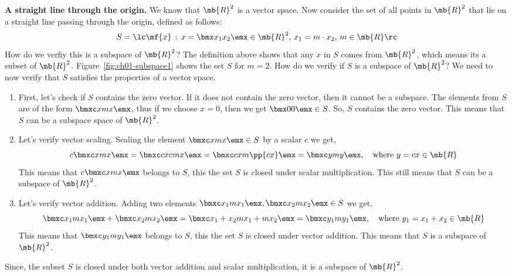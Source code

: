 \begin{boxedstuff}
\begin{example}
    \textbf{A straight line through the origin.} We know that $\mb{R}^2$ is a vector space. Now consider the set of all points in $\mb{R}^2$ that lie on a straight line passing through the origin, defined as follows:
    \[ S = \lc \mf{x} \, : \, x = \bmx x_1 \\ x_2 \emx \in \mb{R}^2, \, x_1 = m \cdot x_2, \, m \in \mb{R} \rc \]
    How do we verfiy this is a subspace of $\mb{R}^2$? The definition above shows that any $x$ in $S$ comes from $\mb{R}^2$, which means its a subset of $\mb{R}^2$. Figure~\ref{fig:ch01-subspace1} shows the set $S$ for $m = 2$.
    \noindent How do we verify if $S$ is a subspace of $\mb{R}^2$? We need to now verify that $S$ satisfies the properties of a vector space.
    \begin{enumerate}
        \item First, let's check if $S$ contains the zero vector. If it does not contain the zero vector, then it cannot be a subspace. The elements from $S$ are of the form $\bmxc x \\ m x\emx$, thus if we choose $x = 0$, then we get $\bmx 0 \\ 0 \emx \in S$. So, $S$ contains the zero vector. This means that $S$ can be a subspace space of $\mb{R}^2$.
        \item Let's verify vector scaling. Scaling the element $\bmxc x \\ m x \emx \in S$ by a scalar $c$ we get,
        \[ c \bmxc x \\ m x\emx = \bmxc c x \\ c m x \emx = \bmxc c x \\ m \pp{c x} \emx = \bmxc y \\ m y\emx, \quad \text{where} \,\, y = c x \in \mb{R} \]
        This means that $c\bmxc x \\ m x\emx$ belongs to $S$, this the set $S$ is closed under scalar multiplication. This still means that $S$ can be a subspace of $\mb{R}^2$.
        \item Let's verify vector addition. Adding two elements $\bmxc x_1 \\ m x_1\emx, \bmxc x_2 \\ m x_2\emx \in S$ we get,
        \[ \bmxc x_1 \\ m x_1\emx + \bmxc x_2 \\ m x_2\emx = \bmxc x_1 + x_2 \\ m x_1 + m x_2 \emx = \bmxc y_1 \\ m y_1\emx, \quad \text{where} \,\, y_1 = x_1 + x_2 \in \mb{R} \]
        This means that $\bmxc y_1 \\ m y_1\emx$ belongs to $S$, this the set $S$ is closed under vector addition. This means that $S$ is a subspace of $\mb{R}^2$.
    \end{enumerate}
    Since, the subset $S$ is closed under both vector addition and scalar multiplication, it is a subspace of $\mb{R}^2$.
    \label{example:subspace-straight-line}
\end{example}
\end{boxedstuff}
